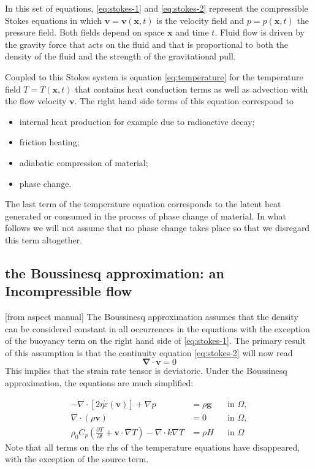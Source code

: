 \documentclass[a4paper]{article}
\begin{document}
In this set of equations, \eqref{eq:stokes-1} and \eqref{eq:stokes-2}
represent the compressible Stokes equations in which $\mathbf v=\mathbf
v(\mathbf x,t)$ is the velocity field and $p=p(\mathbf x,t)$ the pressure
field. Both fields depend on space $\mathbf x$ and time $t$. Fluid flow is
driven by the gravity force that acts on the fluid and that is proportional to
both the density of the fluid and the strength of the gravitational pull.

Coupled to this Stokes system is equation \eqref{eq:temperature} for the
temperature field $T=T(\mathbf x,t)$ that contains heat conduction terms as
well as advection with the flow velocity $\mathbf v$. The right hand side
terms of this equation correspond to
\begin{itemize}
\item internal heat production for example due to radioactive decay;
\item friction heating;
\item adiabatic compression of material;
\item phase change.
\end{itemize}
The last term of the temperature equation corresponds to
the latent heat generated or consumed in the process of phase change of material. 
In what follows we will not assume that no phase change takes place so that we disregard this term 
altogether.

\subsection{the Boussinesq approximation: an Incompressible flow}


[from aspect manual]
The Boussinesq approximation assumes that the density can be
considered constant in all occurrences in the equations with the exception of
the buoyancy term on the right hand side of \eqref{eq:stokes-1}. The primary
result of this assumption is that the continuity equation \eqref{eq:stokes-2}
will now read
\[
{\bm \nabla}\cdot{\bm v} = 0
\]
This implies that the strain rate tensor is deviatoric.
Under the Boussinesq approximation, the equations are much simplified:

\begin{align}
  \label{eq:stokes-1}
  -\nabla \cdot \left[2\eta \dot\varepsilon(\bm v)
                \right] + \nabla p &=
  \rho \bm g
  &
  & \textrm{in $\Omega$},
  \\
  \label{eq:stokes-2}
  \nabla \cdot (\rho \bm v) &= 0
  &
  & \textrm{in $\Omega$},
  \\
  \label{eq:temperature}
  \rho_0 C_p \left(\frac{\partial T}{\partial t} + \bm v\cdot\nabla T\right)
  - \nabla\cdot k\nabla T
  &=
  \rho H
  &
  & \textrm{in $\Omega$}
\end{align}
Note that all terms on the rhs of the temperature equations have disappeared, with the exception 
of the source term.
\end{document}
